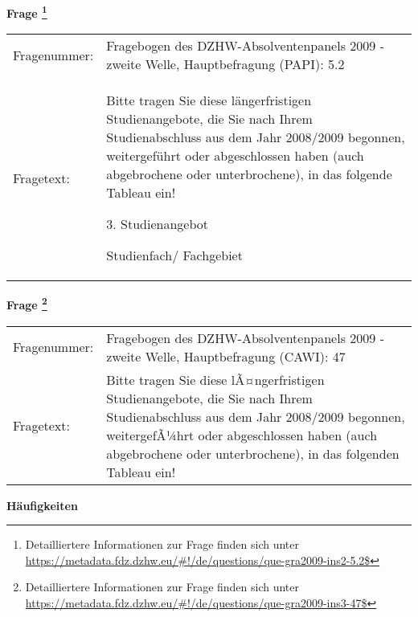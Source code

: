 				\vspace*{0.5cm}
                \noindent\textbf{Frage
	                \footnote{Detailliertere Informationen zur Frage finden sich unter
		              \url{https://metadata.fdz.dzhw.eu/\#!/de/questions/que-gra2009-ins2-5.2$}}}\\
				\begin{tabularx}{\hsize}{@{}lX}
					Fragenummer: &
					  Fragebogen des DZHW-Absolventenpanels 2009 - zweite Welle, Hauptbefragung (PAPI):
					  5.2
 \\
					Fragetext: & Bitte tragen Sie diese längerfristigen Studienangebote, die Sie nach Ihrem Studienabschluss aus dem Jahr 2008/2009 begonnen, weitergeführt oder abgeschlossen haben (auch abgebrochene oder unterbrochene), in das folgende Tableau ein!\par  3. Studienangebot\par  Studienfach/ Fachgebiet \\
				\end{tabularx}
				\vspace*{0.5cm}
                \noindent\textbf{Frage
	                \footnote{Detailliertere Informationen zur Frage finden sich unter
		              \url{https://metadata.fdz.dzhw.eu/\#!/de/questions/que-gra2009-ins3-47$}}}\\
				\begin{tabularx}{\hsize}{@{}lX}
					Fragenummer: &
					  Fragebogen des DZHW-Absolventenpanels 2009 - zweite Welle, Hauptbefragung (CAWI):
					  47
 \\
					Fragetext: & Bitte tragen Sie diese lÃ¤ngerfristigen Studienangebote, die Sie nach Ihrem Studienabschluss aus dem Jahr 2008/2009 begonnen, weitergefÃ¼hrt oder abgeschlossen haben (auch abgebrochene oder unterbrochene), in das folgenden Tableau ein! \\
				\end{tabularx}





        		\vspace*{0.5cm}
                \noindent\textbf{Häufigkeiten}


